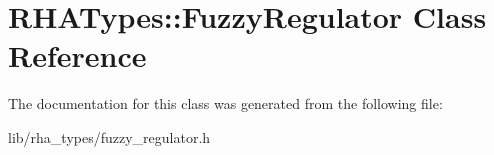 \hypertarget{classRHATypes_1_1FuzzyRegulator}{}\section{R\+H\+A\+Types\+:\+:Fuzzy\+Regulator Class Reference}
\label{classRHATypes_1_1FuzzyRegulator}


The documentation for this class was generated from the following file\+:\begin{DoxyCompactItemize}
\item 
lib/rha\+\_\+types/fuzzy\+\_\+regulator.\+h\end{DoxyCompactItemize}
